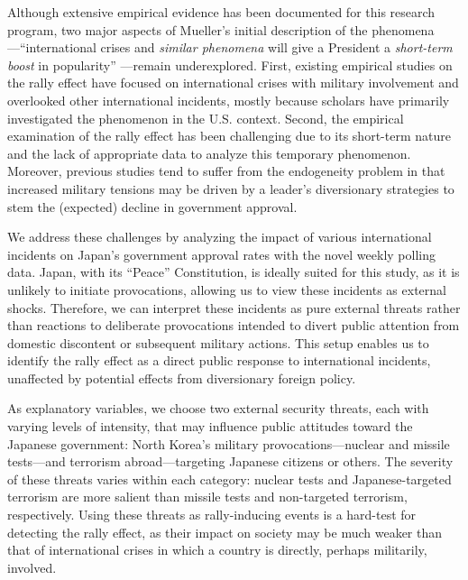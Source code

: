 \documentclass[letterpaper,12pt]{scrartcl}
\begin{document}
Although extensive empirical evidence has been documented for this research program, two major aspects of Mueller's initial description of the phenomena---``international crises and \textit{similar phenomena} will give a President a \textit{short-term boost} in popularity'' \citep[][p.~20; emphasis added by authors]{Mueller1970APSR}---remain underexplored. First, existing empirical studies on the rally effect have focused on international crises with military involvement and overlooked other international incidents, mostly because scholars have primarily investigated the phenomenon in the U.S. context. Second, the empirical examination of the rally effect has been challenging due to its short-term nature and the lack of appropriate data to analyze this temporary phenomenon. Moreover, previous studies tend to suffer from the endogeneity problem in that increased military tensions may be driven by a leader's diversionary strategies to stem the (expected) decline in government approval.



We address these challenges by analyzing the impact of various international incidents on Japan's government approval rates with the novel weekly polling data. Japan, with its ``Peace'' Constitution, is ideally suited for this study, as it is unlikely to initiate provocations, allowing us to view these incidents as external shocks. Therefore, we can interpret these incidents as pure external threats rather than reactions to deliberate provocations intended to divert public attention from domestic discontent or subsequent military actions. This setup enables us to identify the rally effect as a direct public response to international incidents, unaffected by potential effects from diversionary foreign policy.

As explanatory variables, we choose two external security threats, each with varying levels of intensity, that may influence public attitudes toward the Japanese government: North Korea's military provocations—nuclear and missile tests—and terrorism abroad—targeting Japanese citizens or others. The severity of these threats varies within each category: nuclear tests and Japanese-targeted terrorism are more salient than missile tests and non-targeted terrorism, respectively. Using these threats as rally-inducing events is a hard-test for detecting the rally effect, as their impact on society may be much weaker than that of international crises in which a country is directly, perhaps militarily, involved.
\end{document}
